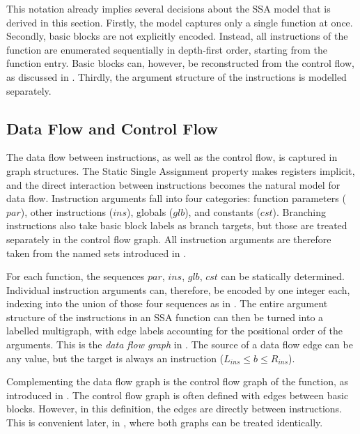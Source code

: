     This notation already implies several decisions about the SSA model that is
    derived in this section.
    Firstly, the model captures only a single function at once.
    Secondly, basic blocks are not explicitly encoded.
    Instead, all instructions of the function are enumerated sequentially in
    depth-first order, starting from the function entry.
    Basic blocks can, however, be reconstructed from the control flow, as
    discussed in .
    Thirdly, the argument structure of the instructions is modelled separately.

\subsection{Data Flow and Control Flow}
\label{sec:derivingamodel}

    The data flow between instructions, as well as the control flow, is captured
    in graph structures.
    The Static Single Assignment property makes registers implicit, and the
    direct interaction between instructions becomes the natural model for data
    flow.
    Instruction arguments fall into four categories: function parameters ($par$),
    other instructions ($ins$), globals ($glb$), and constants ($cst$).
    Branching instructions also take basic block labels as branch targets,
    but those are treated separately in the control flow graph.
    All instruction arguments are therefore taken from the named sets introduced
    in .

    For each function, the sequences $par$, $ins$, $glb$, $cst$ can be
    statically determined.
    Individual instruction arguments can, therefore, be encoded by one integer
    each, indexing into the union of those four sequences as in
    .
    The entire argument structure of the instructions in an SSA
    function can then be turned into a labelled multigraph, with edge labels
    accounting for the positional order of the arguments.
    This is the {\it data flow graph} in .
    The source of a data flow edge can be any value, but the target is
    always an instruction ($L_{ins}\leq b\leq R_{ins}$).

    Complementing the data flow graph is the control flow graph of the function,
    as introduced in .
    The control flow graph is often defined with edges between basic blocks.
    However, in this definition, the edges are directly between instructions.
    This is convenient later, in
    , where both graphs
    can be treated identically.

